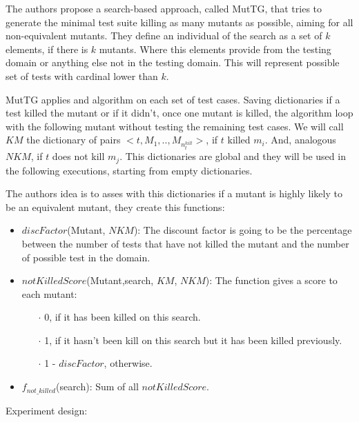 \begin{itemize}
The authors propose a search-based approach, called MutTG, that tries to generate the minimal test suite killing as many mutants as possible, aiming for all non-equivalent mutants. They define an individual of the search as a set of $k$ elements, if there is $k$ mutants. Where this elements provide from the testing domain or anything else not in the testing domain. This will represent possible set of tests with cardinal lower than $k$.\newline

MutTG applies and algorithm on each set of test cases. Saving dictionaries if a test killed the mutant or if it didn't, once one mutant is killed, the algorithm loop with the following mutant without testing the remaining test cases. We will call $KM$ the dictionary of pairs $<t,{M_{1},..,M_{n_{t}^{kill}}}>$, if $t$ killed $m_{i}$. And, analogous $NKM$, if $t$ does not kill $m_{j}$. This dictionaries are global and they will be used in the following executions, starting from empty dictionaries.\newline

The authors idea is to asses with this dictionaries if a mutant is highly likely to be an equivalent mutant, they create this functions:
\begin{itemize}
    \item $discFactor$(Mutant, $NKM$): The discount factor is going to be the percentage between the number of tests that have not killed the mutant and the number of possible test in the domain.
    \item $notKilledScore$(Mutant,search, $KM$, $NKM$): The function gives a score to each mutant:
        \begin{itemize}
            \item[$\cdot$] 0, if it has been killed on this search.
            \item[$\cdot$] 1, if it hasn't been kill on this search but it has been killed previously.
            \item[$\cdot$] 1 - $discFactor$, otherwise.
        \end{itemize}
    \item $f_{not\_killed}$(search): Sum of all $notKilledScore$.
\end{itemize}

Experiment design:


\end{itemize}
